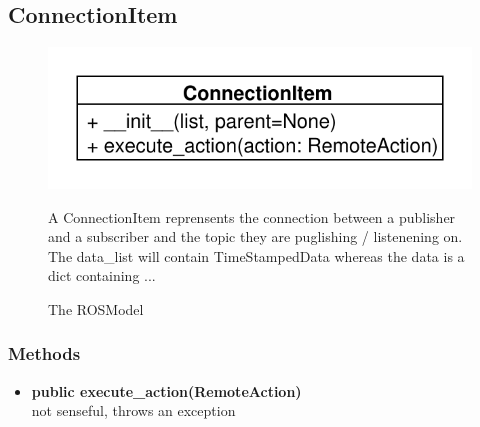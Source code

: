 \subsection{ConnectionItem}
\begin{figure}[htbp]
	\begin{minipage}[t]{7cm}
		\vspace{0pt}
		\centering
		\includegraphics[scale=0.6]{./diagram_pictures/ConnectionItem.pdf}
		\caption{The ROSModel}
	\end{minipage}
	\hfill
	\begin{minipage}[t]{8cm}
		\vspace{10pt}
		A ConnectionItem reprensents the connection between a publisher and a
		subscriber and the topic they are puglishing / listenening on.
		The data\_list will contain TimeStampedData whereas the data is a dict
		containing ...
	\end{minipage}
\end{figure}  
\subsubsection{Methods}
\begin{itemize}
  \item \textbf{public execute\_action(RemoteAction)}\\ 
  not senseful, throws an exception
\end{itemize}

